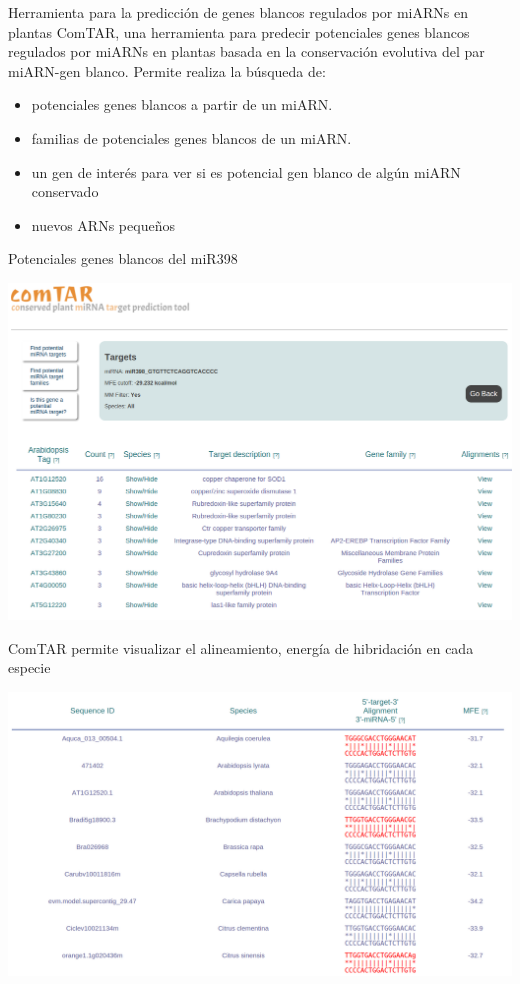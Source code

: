 \documentclass{beamer}
\begin{document}
\begin{frame}{Herramienta para la predicción de genes blancos regulados por miARNs en plantas}
ComTAR, una herramienta para predecir potenciales genes blancos regulados por miARNs en plantas basada en la conservación evolutiva del par miARN-gen blanco. Permite realiza la búsqueda de:


\begin{itemize}
    \item potenciales genes blancos a partir de un miARN.
    \item familias de potenciales genes blancos de un miARN.
    \item un gen de interés para ver si es potencial gen blanco de algún miARN conservado
    \item nuevos ARNs pequeños
\end{itemize}
    \begin{center}
    \end{center}
\end{frame}

\begin{frame}{Potenciales genes blancos del miR398}
	\begin{center}
		\includegraphics[width=.8\textwidth]{img/comTAR_find_targets.png}
	\end{center}
\end{frame}

\begin{frame}{ComTAR permite visualizar el alineamiento, energía de hibridación en cada especie}
	\begin{center}
		\includegraphics[width=.7\textwidth]{img/comTAR_fig2.png}
	\end{center}
\end{frame}
\end{document}
